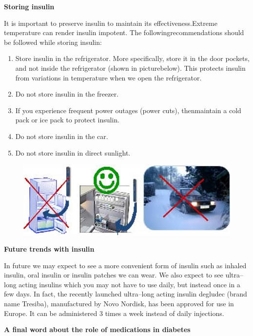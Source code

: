 \noindent\textbf{Storing insulin}

It is important to preserve insulin to maintain its effectiveness.\break Extreme temperature can render insulin impotent. The following\break recommendations should be followed while storing insulin:

\begin{enumerate}[•]
\itemsep=0pt
\item Store insulin in the refrigerator. More specifically, store it in the door pockets, and not inside the refrigerator (shown in picture\break below). This protects insulin from variations in temperature when we open the refrigerator.
\item Do not store insulin in the freezer.
\item If you experience frequent power outages (power cuts), then\break maintain a cold pack or ice pack to protect insulin.
\item Do not store insulin in the car.
\item Do not store insulin in direct sunlight.
\end{enumerate}

\begin{figure}[h]
\centering
\includegraphics[scale=2.2]{images/090.jpg}
\end{figure}

\vskip 8pt

\noindent\textbf{Future trends with insulin}

In future we may expect to see a more convenient form of insulin such as inhaled insulin, oral insulin or insulin patches we can wear. We also expect to see ultra–long acting insulins which you may not have to use daily, but instead once in a few days. In fact, the recently launched ultra–long acting insulin degludec (brand name Tresiba), manufactu\-red by Novo Nordisk, has been approved for use in Europe. It can be administered 3 times a week instead of daily injections.

\vskip 7pt

\noindent\textbf{A final word about the role of medications in diabetes}

